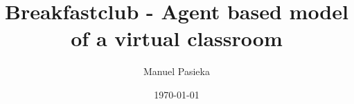 \documentclass[11pt, a4paper, english]{book}
\title{Breakfastclub - Agent based model of a virtual classroom}
\author{Manuel Pasieka}
\date{\today}
\begin{document}
\renewcommand{\listfigurename}{Figures}
\renewcommand{\listtablename}{Tables}
\renewcommand{\contentsname}{Additional Content}
\renewcommand{\figurename}{Figura}
\renewcommand{\tablename}{Tabla} 

\newcommand{\bb}[1][5mm]{\vspace{#1}}

\maketitle

\frontmatter

\tableofcontents
\listoffigures
\listoftables

\setlength{\parindent}{0pt}



\mainmatter













 


\appendix


\end{document}
